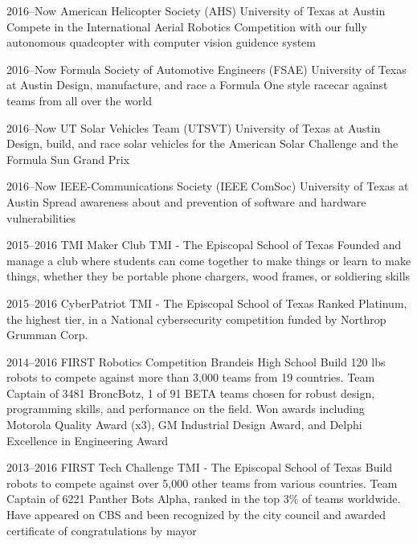 \documentclass[]{friggeri-cv} %
\begin{document}
\begin{entrylist}

	\entry
	{2016--Now}
	{American Helicopter Society (AHS)}
	{University of Texas at Austin}
	{Compete in the International Aerial Robotics Competition with our fully autonomous quadcopter with computer vision guidence system}


	\entry
	{2016--Now}
	{Formula Society of Automotive Engineers (FSAE)}
	{University of Texas at Austin}
	{Design, manufacture, and race a Formula One style racecar against teams from all over the world}


	\entry
	{2016--Now}
	{UT Solar Vehicles Team (UTSVT)}
	{University of Texas at Austin}
	{Design, build, and race solar vehicles for the American Solar Challenge and the Formula Sun Grand Prix}


	\entry
	{2016--Now}
	{IEEE-Communications Society (IEEE ComSoc)}
	{University of Texas at Austin}
	{Spread awareness about and prevention of software and hardware vulnerabilities}


	\entry
	{2015--2016}
	{TMI Maker Club}
	{TMI - The Episcopal School of Texas}
	{Founded and manage a club where students can come together to make things or learn to make things, whether they be portable phone chargers, wood frames, or soldiering skills}


	\entry
	{2015--2016}
	{CyberPatriot}
	{TMI - The Episcopal School of Texas}
	{Ranked Platinum, the highest tier, in a National cybersecurity competition funded by Northrop Grumman Corp.}


	\entry
	{2014--2016}
	{FIRST Robotics Competition}
	{Brandeis High School}
	{Build 120 lbs robots to compete against more than 3,000 teams from 19 countries. Team Captain of 3481 BroncBotz, 1 of 91 BETA teams chosen for robust design, programming skills, and performance on the field. Won awards including Motorola Quality Award (x3), GM Industrial Design Award, and Delphi Excellence in Engineering Award}


	\entry
	{2013--2016}
	{FIRST Tech Challenge}
	{TMI - The Episcopal School of Texas}
	{Build robots to compete against over 5,000 other teams from various countries. Team Captain of 6221 Panther Bots Alpha, ranked in the top 3\% of teams worldwide. Have appeared on CBS and been recognized by the city council and awarded certificate of congratulations by mayor}

\end{entrylist}
\end{document}

